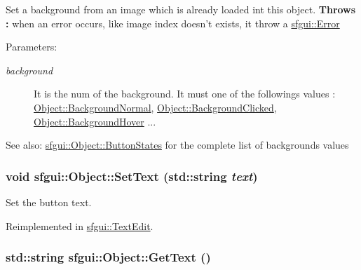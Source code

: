 Set a background from an image which is already loaded int this object. {\bf Throws : }when an error occurs, like image index doesn't exists, it throw a \hyperlink{classsfgui_1_1Error}{sfgui::Error} \begin{Desc}
\item[Parameters:]
\begin{description}
\item[{\em background}]It is the num of the background. It must one of the followings values : \hyperlink{classsfgui_1_1Object_8a7d7ae20a88b7ef8a104f7e6c8596cee8211d79a1f35d08db2b31a914bddc38}{Object::BackgroundNormal}, \hyperlink{classsfgui_1_1Object_8a7d7ae20a88b7ef8a104f7e6c8596ce03b529b6f0fee7ab7cc0033441180b67}{Object::BackgroundClicked}, \hyperlink{classsfgui_1_1Object_8a7d7ae20a88b7ef8a104f7e6c8596ce9befc9dbae9107e3e7546af33a139df9}{Object::BackgroundHover} ... \end{description}
\end{Desc}
\begin{Desc}
\item[See also:]\hyperlink{classsfgui_1_1Object_8a7d7ae20a88b7ef8a104f7e6c8596ce}{sfgui::Object::ButtonStates} for the complete list of backgrounds values \end{Desc}
\hypertarget{classsfgui_1_1Object_64c05d85588778a652d11c7a1daf8db0}{
\subsubsection[SetText]{\setlength{\rightskip}{0pt plus 5cm}void sfgui::Object::SetText (std::string {\em text})}}
\label{classsfgui_1_1Object_64c05d85588778a652d11c7a1daf8db0}




Set the button text. 

Reimplemented in \hyperlink{classsfgui_1_1TextEdit_c6f06a7dc81611a50226e10287e87e1e}{sfgui::TextEdit}.\hypertarget{classsfgui_1_1Object_070ede7cda0e7b3cab312aac5013a206}{
\subsubsection[GetText]{\setlength{\rightskip}{0pt plus 5cm}std::string sfgui::Object::GetText ()}}
\label{classsfgui_1_1Object_070ede7cda0e7b3cab312aac5013a206}



